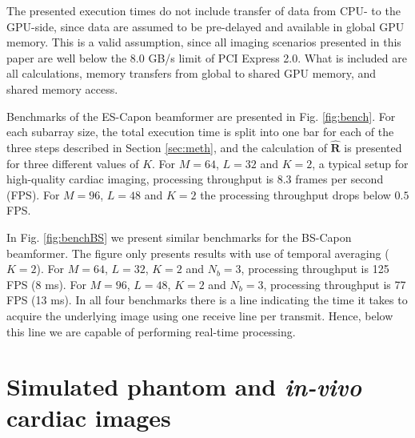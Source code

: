 \documentclass[journal]{IEEEtran}
\newcommand{\mat}[1]{\mathbf{#1}}
\begin{document}
The presented execution times do not include transfer of data from CPU- to the GPU-side, since data are assumed to be pre-delayed and available in global GPU memory. This is a valid assumption, since all imaging scenarios presented in this paper are well below the 8.0 GB/s limit of PCI Express 2.0. What is included are all calculations, memory transfers from global to shared GPU memory, and shared memory access. 

Benchmarks of the ES-Capon beamformer are presented in Fig. \ref{fig:bench}. For each subarray size, the total execution time is split into one bar for each of the three steps described in Section \ref{sec:meth}, and the calculation of $\mat{\hat{R}}$ is presented for three different values of $K$. For $M=64$, $L=32$ and $K=2$, a typical setup for high-quality cardiac imaging, processing throughput is 8.3 frames per second (FPS). For $M=96$, $L=48$ and $K=2$ the processing throughput drops below $0.5$ FPS.

In Fig. \ref{fig:benchBS} we present similar benchmarks for the BS-Capon beamformer. The figure only presents results with use of temporal averaging ($K=2$). For $M=64$, $L=32$, $K=2$ and $N_b=3$, processing throughput is 125 FPS (8 ms). For $M=96$, $L=48$, $K=2$ and $N_b=3$, processing throughput is 77 FPS (13 ms). In all four benchmarks there is a line indicating the time it takes to acquire the underlying image using one receive line per transmit. Hence, below this line we are capable of performing real-time processing.

\section{Simulated phantom and \textit{in-vivo} cardiac images}\label{sec:images}
\end{document}
